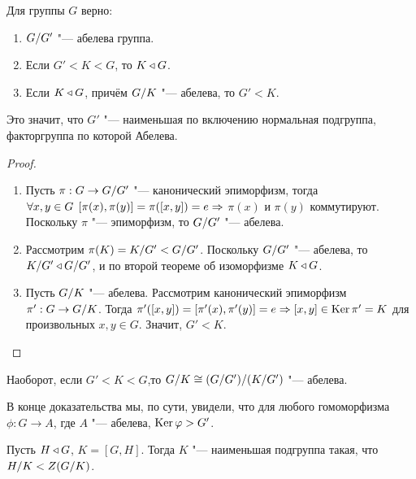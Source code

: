 \documentclass[main]{subfiles}
\begin{document}
\begin{theorem}
  Для группы \( G \) верно:
  \begin{enumerate}
    \item \( \Factor{G}[G'] \) "--- абелева группа.
    \item Если \( G' < K < G \), то \( K \triangleleft G \).
    \item Если \( K \triangleleft G \), причём \( \Factor{G}[K] \) "---
      абелева, то \( G' < K \).
  \end{enumerate}
\end{theorem}
\begin{remark}
  Это значит, что \( G' \) "--- наименьшая  по
  включению нормальная подгруппа,
  факторгруппа по которой Абелева.
\end{remark}
\begin{proof}~
  \begin{enumerate}
    \item Пусть \( \pi : G \to \Factor{G}[G'] \) "---
      канонический эпиморфизм, тогда
      \( \forall {x, y \in G} \; \, [\pi(x), \pi(y)] =
      \pi([x, y]) = e \Rightarrow \)
      \( \pi(x) \) и \( \pi(y) \) коммутируют.
      Поскольку \( \pi \) "--- эпиморфизм,
      то \( \Factor{G}[G'] \) "--- абелева.
    \item Рассмотрим \( \pi(K) = \Factor{K}[G'] <
      \Factor{G}[G'] \). Поскольку \( \Factor{G}[G'] \) "---
      абелева, то \( \Factor{K}[G'] \NSG \Factor{G}[G'] \), и
      по второй теореме об изоморфизме \( K \triangleleft G \).
    \item Пусть \( \Factor{G}[K] \) "--- абелева.
      Рассмотрим канонический эпиморфизм
      \( \pi' : G \to \Factor{G}[K] \).
      Тогда \( \pi'([x, y]) = [\pi'(x), \pi'(y)] = e \Rightarrow
      [x, y] \in \operatorname{Ker} \pi' = K \) для произвольных
      \( x, y \in G \). Значит, \( G' < K \).
  \end{enumerate}
\end{proof}

\begin{remark}
  Наоборот, если \( G' < K < G \),то
  \( \Factor{G}[K] \cong
  \Factor{(\Factor{G}[G'])}[(\Factor{K}[G'])] \) "---
  абелева.
\end{remark}
\begin{remark}
  В конце доказательства мы, по сути, увидели,
  что для любого гомоморфизма \( \phi : G \to A \),
  где \( A \) "--- абелева, \( \operatorname{Ker} \varphi > G' \).
\end{remark}

\begin{exercise}
  Пусть $H \triangleleft G$, $K = [G, H]$. Тогда $K$ "--- наименьшая
  подгруппа такая, что $\Factor{H}[K] < Z(\Factor{G}[K])$.
\end{exercise}
\end{document}
